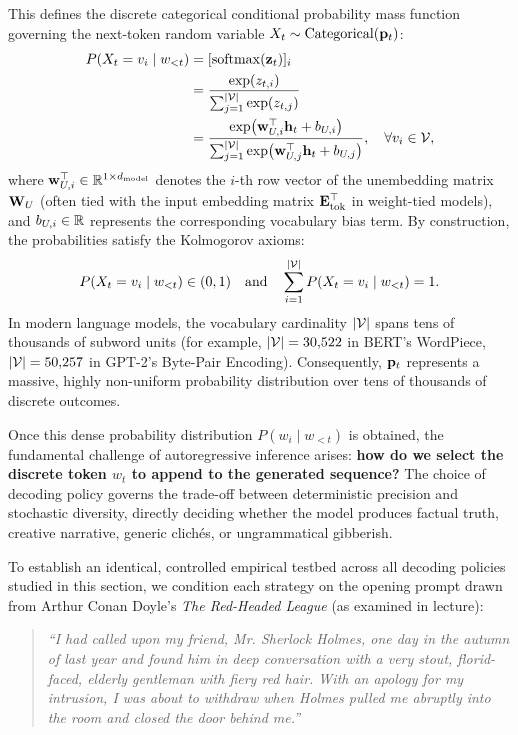 \documentclass[../../main.tex]{subfiles}
\begin{document}
This defines the discrete categorical conditional probability mass function governing the next-token random variable $X_t \sim \operatorname{Categorical}(\mathbf{p}_t)$:
\begin{align}
\label{eq:unembedding_softmax_distribution}
P(X_t = v_i \mid w_{<t}) &= [\operatorname{softmax}(\mathbf{z}_t)]_i \notag \\
&= \frac{\exp(z_{t, i})}{\sum_{j=1}^{|\mathcal{V}|} \exp(z_{t, j})} \notag \\
&= \frac{\exp\bigl(\mathbf{w}_{U, i}^\top \mathbf{h}_t + b_{U, i}\bigr)}{\sum_{j=1}^{|\mathcal{V}|} \exp\bigl(\mathbf{w}_{U, j}^\top \mathbf{h}_t + b_{U, j}\bigr)}, \quad \forall v_i \in \mathcal{V},
\end{align}
where $\mathbf{w}_{U, i}^\top \in \mathbb{R}^{1 \times d_{\text{model}}}$ denotes the $i$-th row vector of the unembedding matrix $\mathbf{W}_U$ (often tied with the input embedding matrix $\mathbf{E}_{\text{tok}}^\top$ in weight-tied models), and $b_{U, i} \in \mathbb{R}$ represents the corresponding vocabulary bias term. By construction, the probabilities satisfy the Kolmogorov axioms:
\begin{equation}
\label{eq:categorical_simplex_properties}
P(X_t = v_i \mid w_{<t}) \in (0, 1) \quad \text{and} \quad \sum_{i=1}^{|\mathcal{V}|} P(X_t = v_i \mid w_{<t}) = 1.
\end{equation}
In modern language models, the vocabulary cardinality $|\mathcal{V}|$ spans tens of thousands of subword units (for example, $|\mathcal{V}| = 30{,}522$ in BERT's WordPiece, $|\mathcal{V}| = 50{,}257$ in GPT-2's Byte-Pair Encoding). Consequently, $\mathbf{p}_t$ represents a massive, highly non-uniform probability distribution over tens of thousands of discrete outcomes. 

Once this dense probability distribution $P(w_i \mid w_{<t})$ is obtained, the fundamental challenge of autoregressive inference arises: \textbf{how do we select the discrete token $\hat{w}_t$ to append to the generated sequence?} The choice of decoding policy governs the trade-off between deterministic precision and stochastic diversity, directly deciding whether the model produces factual truth, creative narrative, generic clichés, or ungrammatical gibberish.

To establish an identical, controlled empirical testbed across all decoding policies studied in this section, we condition each strategy on the opening prompt drawn from Arthur Conan Doyle's \emph{The Red-Headed League} (as examined in lecture):
\begin{quote}
\emph{``I had called upon my friend, Mr. Sherlock Holmes, one day in the autumn of last year and found him in deep conversation with a very stout, florid-faced, elderly gentleman with fiery red hair. With an apology for my intrusion, I was about to withdraw when Holmes pulled me abruptly into the room and closed the door behind me.''}
\end{quote}
\end{document}
